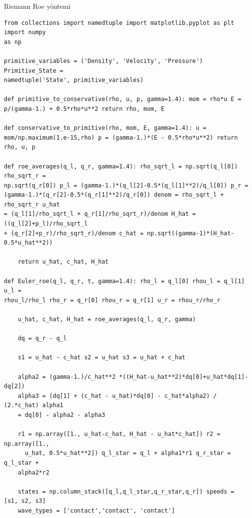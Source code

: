 














Riemann Roe yöntemi

\begin{verbatim}
from collections import namedtuple import matplotlib.pyplot as plt import numpy
as np

primitive_variables = ('Density', 'Velocity', 'Pressure') Primitive_State =
namedtuple('State', primitive_variables)

def primitive_to_conservative(rho, u, p, gamma=1.4): mom = rho*u E =
p/(gamma-1.) + 0.5*rho*u**2 return rho, mom, E

def conservative_to_primitive(rho, mom, E, gamma=1.4): u =
mom/np.maximum(1.e-15,rho) p = (gamma-1.)*(E - 0.5*rho*u**2) return rho, u, p

def roe_averages(q_l, q_r, gamma=1.4): rho_sqrt_l = np.sqrt(q_l[0]) rho_sqrt_r =
np.sqrt(q_r[0]) p_l = (gamma-1.)*(q_l[2]-0.5*(q_l[1]**2)/q_l[0]) p_r =
(gamma-1.)*(q_r[2]-0.5*(q_r[1]**2)/q_r[0]) denom = rho_sqrt_l + rho_sqrt_r u_hat
= (q_l[1]/rho_sqrt_l + q_r[1]/rho_sqrt_r)/denom H_hat = ((q_l[2]+p_l)/rho_sqrt_l
+ (q_r[2]+p_r)/rho_sqrt_r)/denom c_hat = np.sqrt((gamma-1)*(H_hat-0.5*u_hat**2))
    
    return u_hat, c_hat, H_hat
        
def Euler_roe(q_l, q_r, t, gamma=1.4): rho_l = q_l[0] rhou_l = q_l[1] u_l =
rhou_l/rho_l rho_r = q_r[0] rhou_r = q_r[1] u_r = rhou_r/rho_r
    
    u_hat, c_hat, H_hat = roe_averages(q_l, q_r, gamma)

    dq = q_r - q_l
    
    s1 = u_hat - c_hat s2 = u_hat s3 = u_hat + c_hat
    
    alpha2 = (gamma-1.)/c_hat**2 *((H_hat-u_hat**2)*dq[0]+u_hat*dq[1]-dq[2])
    alpha3 = (dq[1] + (c_hat - u_hat)*dq[0] - c_hat*alpha2) / (2.*c_hat) alpha1
    = dq[0] - alpha2 - alpha3
    
    r1 = np.array([1., u_hat-c_hat, H_hat - u_hat*c_hat]) r2 = np.array([1.,
      u_hat, 0.5*u_hat**2]) q_l_star = q_l + alpha1*r1 q_r_star = q_l_star +
    alpha2*r2
    
    states = np.column_stack([q_l,q_l_star,q_r_star,q_r]) speeds = [s1, s2, s3]
    wave_types = ['contact','contact', 'contact']
    

\end{verbatim}
